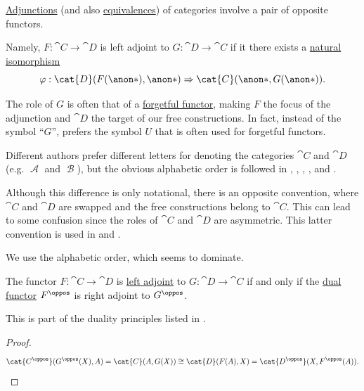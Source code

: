 \begin{remark}\label{rem:category_adjunctions_category_order}
  \hyperref[def:category_adjunction]{Adjunctions} (and also \hyperref[def:equivalence_of_categories]{equivalences}) of categories involve a pair of opposite functors.

  Namely, \( F: \cat{C} \to \cat{D} \) is left adjoint to \( G: \cat{D} \to \cat{C} \) if it there exists a \hyperref[def:natural_isomorphism]{natural isomorphism}
  \begin{equation*}
    \varphi: \cat{D}(F(\anon*), \anon*) \Rightarrow \cat{C}(\anon*, G(\anon*)).
  \end{equation*}

  The role of \( G \) is often that of a \hyperref[con:forgetful_functor]{forgetful functor}, making \( F \) the focus of the adjunction and \( \cat{D} \) the target of our free constructions. In fact, instead of the symbol \enquote{\( G \)}, \textcite[def. 9.1]{
  Awodey2010CategoryTheory} prefers the symbol \( U \) that is often used for forgetful functors.

  Different authors prefer different letters for denoting the categories \( \cat{C} \) and \( \cat{D} \) (e.g. \( \mscrA \) and \( \mscrB \)), but the obvious alphabetic order is followed in
  \cite[def. 9.1]{Awodey2010CategoryTheory},
  \cite[def. 4.1.1]{Perrone2024StartingCategoryTheory},
  \cite[def. 2.1.1]{Leinster2014BasicCategoryTheory},
  \cite[116]{Riehl2016CategoryTheory},
  \cite[493]{Aluffi2009Algebra} and
  \cite[178]{ЦаленкоШульгейфер1974ОсновыТеорииКатегорий}.

  Although this difference is only notational, there is an opposite convention, where \( \cat{C} \) and \( \cat{D} \) are swapped and the free constructions belong to \( \cat{C} \). This can lead to some confusion since the roles of \( \cat{C} \) and \( \cat{D} \) are asymmetric. This latter convention is used in
  \cite[80]{MacLane1998CategoryTheory} and
  \cite[def. 16.4.1]{Schubert1972Categories}.

  We use the alphabetic order, which seems to dominate.
\end{remark}

\begin{proposition}\label{thm:category_adjunction_duality}
  The functor \( F: \cat{C} \to \cat{D} \) is \hyperref[def:category_adjunction]{left adjoint} to \( G: \cat{D} \to \cat{C} \) if and only if the \hyperref[def:opposite_functor]{dual functor} \( F^\oppos \) is right adjoint to \( G^\oppos \).

  This is part of the duality principles listed in .
\end{proposition}
\begin{proof}
  \begin{equation*}
    \cat{C^\oppos}(G^\oppos(X), A) = \cat{C}(A, G(X)) \cong \cat{D}(F(A), X) = \cat{D^\oppos}(X, F^\oppos(A)).
  \end{equation*}
\end{proof}

